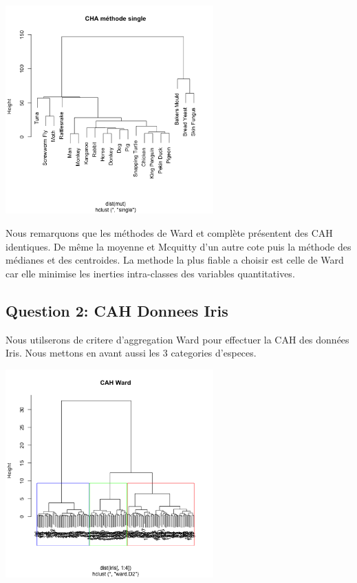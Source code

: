 \documentclass[10pt]{article}
\begin{document}
	\begin{center}
		\includegraphics[height = 8cm, width = 8cm]{Figures/HClust/hclust_Mutations_sgl.png}
	\end{center}
	
	Nous remarquons que les méthodes de Ward et complète présentent des CAH identiques. De même la moyenne et Mcquitty d'un autre cote puis la méthode des médianes et des centroides.
	La methode la plus fiable a choisir est celle de Ward car elle minimise les inerties intra-classes des variables quantitatives.

	\subsection{Question 2:  CAH Donnees Iris}
	
	Nous utilserons de critere d'aggregation Ward pour effectuer la CAH des données Iris. Nous mettons en avant aussi les 3 categories d'especes.
	\begin{center}
		\includegraphics[height = 8cm, width = 8cm]{Figures/HClust/hclust_Iris_ward.png}
	\end{center}
	
\end{document}
